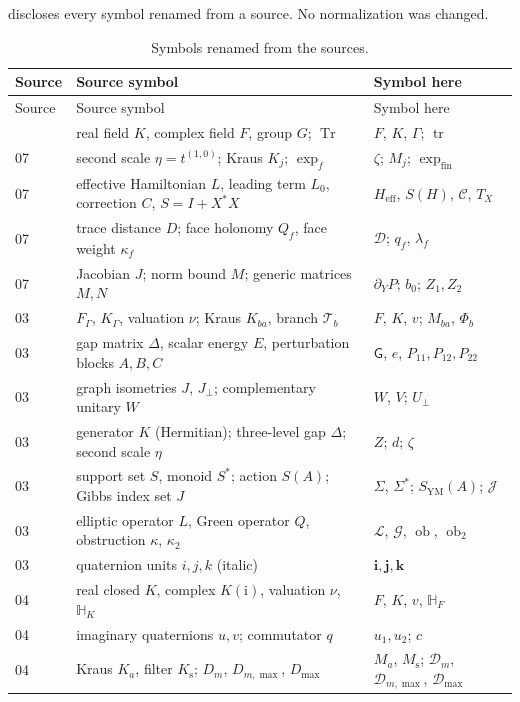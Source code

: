 \documentclass[11pt,oneside]{article}
\numberwithin{equation}{section}
\theoremstyle{plain}
\theoremstyle{definition}
\theoremstyle{remark}
\newcommand{\HH}{\mathbb H}
\newcommand{\HF}{\mathbb H_F}
\newcommand{\TD}{\mathcal D}
\newcommand{\qi}{\mathbf i}
\newcommand{\qj}{\mathbf j}
\newcommand{\qk}{\mathbf k}
\newcommand{\Gap}{\mathsf G}
\newcommand{\Heff}{H_{\mathrm{eff}}}
\newcommand{\Corr}{\mathcal C}
\newcommand{\Lop}{\mathcal L}
\newcommand{\Green}{\mathcal G}
\newcommand{\ob}{\operatorname{ob}}
\newcommand{\expfin}{\exp_{\mathrm{fin}}}
\newcommand{\SYM}{S_{\mathrm{YM}}}
\DeclareMathOperator{\tr}{tr}
\DeclareMathOperator{\Tr}{Tr}
\begin{document}
 discloses every symbol renamed from a source. No normalization was changed.

\begin{longtable}{@{}L{0.07\textwidth}L{0.40\textwidth}L{0.45\textwidth}@{}}
\caption{Symbols renamed from the sources.}\label{qgs:tab:renamed}\\
\toprule
Source & Source symbol & Symbol here\\
\midrule
\endfirsthead
\toprule
Source & Source symbol & Symbol here\\
\midrule
\endhead
\bottomrule
{} & real field $K$, complex field $F$, group $G$; $\Tr$ & $F$, $K$, $\Gamma$; $\tr$\\
07 & second scale $\eta=t^{(1,0)}$; Kraus $K_j$; $\exp_f$ & $\zeta$; $M_j$; $\expfin$\\
07 & effective Hamiltonian $L$, leading term $L_0$, correction $C$, $S=I+X^*X$ & $\Heff$, $S(H)$, $\Corr$, $T_X$\\
07 & trace distance $D$; face holonomy $Q_f$, face weight $\kappa_f$ & $\TD$; $q_f$, $\lambda_f$\\
07 & Jacobian $J$; norm bound $M$; generic matrices $M,N$ & $\partial_YP$; $b_0$; $Z_1,Z_2$\\
03 & $F_\Gamma$, $K_\Gamma$, valuation $\nu$; Kraus $K_{ba}$, branch $\mathcal T_b$ & $F$, $K$, $v$; $M_{ba}$, $\Phi_b$\\
03 & gap matrix $\Delta$, scalar energy $E$, perturbation blocks $A,B,C$ & $\Gap$, $e$, $P_{11},P_{12},P_{22}$\\
03 & graph isometries $J$, $J_\perp$; complementary unitary $W$ & $W$, $V$; $U_\perp$\\
03 & generator $K$ (Hermitian); three-level gap $\Delta$; second scale $\eta$ & $Z$; $d$; $\zeta$\\
03 & support set $S$, monoid $S^*$; action $S(A)$; Gibbs index set $J$ & $\Sigma$, $\Sigma^*$; $\SYM(A)$; $\mathcal J$\\
03 & elliptic operator $L$, Green operator $Q$, obstruction $\kappa$, $\kappa_2$ & $\Lop$, $\Green$, $\ob$, $\ob_2$\\
03 & quaternion units $i,j,k$ (italic) & $\qi,\qj,\qk$\\
04 & real closed $K$, complex $K(\mathrm i)$, valuation $\nu$, $\HH_K$ & $F$, $K$, $v$, $\HF$\\
04 & imaginary quaternions $u,v$; commutator $q$ & $u_1,u_2$; $c$\\
04 & Kraus $K_a$, filter $K_{\mathrm s}$; $D_m$, $D_{m,\max}$, $D_{\max}$ & $M_a$, $M_{\mathrm s}$; $\TD_m$, $\TD_{m,\max}$, $\TD_{\max}$\\

\end{longtable}
\end{document}
